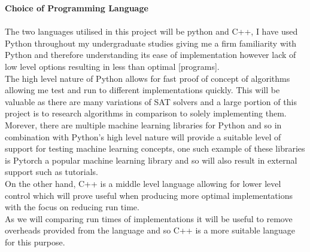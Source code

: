 \documentclass[12pt,a4paper]{article}
\begin{document}
{\bf Choice of Programming Language} \\\\
The two languages utilised in this project will be python and C++, I have used Python throughout my undergraduate studies giving me a firm familiarity with Python and therefore understanding its ease of implementation however lack of low level options resulting in less than optimal [programs]. \\
The high level nature of Python allows for fast proof of concept of algorithms allowing me test and run to different implementations quickly. This will be valuable as there are many variations of SAT solvers and a large portion of this project is to research algorithms in comparison to solely implementing them. \\
Morever, there are multiple machine learning libraries for Python and so in combination with Python's high level nature will provide a suitable level of support for testing machine learning concepts, one such example of these libraries is Pytorch a popular machine learning library and so will also result in external support such as tutorials. \\
On the other hand, C++ is a middle level language allowing for lower level control which will prove useful when producing more optimal implementations with the focus on reducing run time.\\
As we will comparing run times of implementations it will be useful to remove overheads provided from the language and so C++ is a more suitable language for this purpose. \\\\
\end{document}
